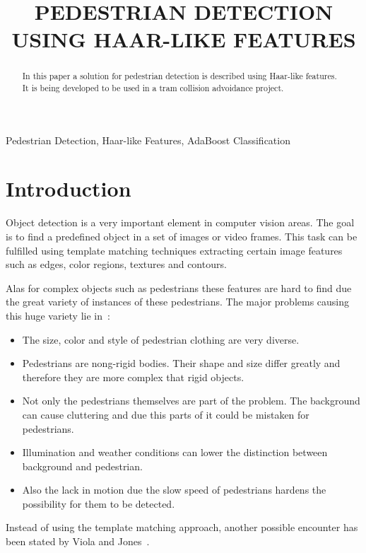 \documentclass{article}
\title{PEDESTRIAN DETECTION USING HAAR-LIKE FEATURES}
\begin{document}
%
\maketitle
%
\begin{abstract}
In this paper a solution for pedestrian detection is described using Haar-like features. It is being developed to be used in a tram collision advoidance project. 
\end{abstract}
%
\begin{keywords}
Pedestrian Detection, Haar-like Features, AdaBoost Classification
\end{keywords}
%
\section{Introduction}
\label{sec:intro}
Object detection is a very important element in computer vision areas. The goal is to find a predefined object in a set of images or video frames. This task can be fulfilled using template matching techniques extracting certain image features such as edges, color regions, textures and contours.
\par
Alas for complex objects such as pedestrians these features are hard to find due the great variety of instances of these pedestrians. The major problems causing this huge variety lie in~\cite{monteiro2006vision}:
\begin{itemize}
\item The size, color and style of pedestrian clothing are very diverse.
\item Pedestrians are nong-rigid bodies. Their shape and size differ greatly and therefore they are more complex that rigid objects.
\item Not only the pedestrians themselves are part of the problem. The background can cause cluttering and due this parts of it could be mistaken for pedestrians.
\item Illumination and weather conditions can lower the distinction between background and pedestrian.
\item Also the lack in motion due the slow speed of pedestrians hardens the possibility for them to be detected.
\end{itemize}
Instead of using the template matching approach, another possible encounter has been stated by Viola and Jones~\cite{viola2001rapid}.
\end{document}
